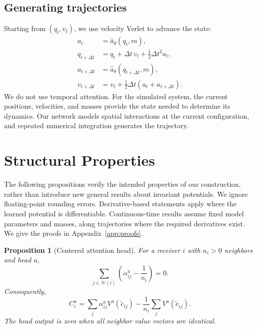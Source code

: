 \documentclass[10pt,letterpaper,twocolumn]{article}
\newtheorem{proposition}{Proposition}[section]
\newcommand{\cN}{\mathcal N}
\newcommand{\ahat}{\widehat a}
\numberwithin{equation}{section}
\begin{document}
\subsection{Generating trajectories}

Starting from $(q_t,v_t)$, we use velocity Verlet to advance the state:
\begin{equation}
\begin{aligned}
a_t&=\ahat_\theta(q_t,m),\\
q_{t+\Delta t}&=q_t+\Delta t\,v_t+\tfrac12\Delta t^2a_t,\\
a_{t+\Delta t}&=\ahat_\theta(q_{t+\Delta t},m),\\
v_{t+\Delta t}&=v_t+\tfrac12\Delta t(a_t+a_{t+\Delta t}).
\end{aligned}
\label{eq:verlet}
\end{equation}
We do not use temporal attention. For the simulated system, the current positions, velocities, and
masses provide the state needed to determine its dynamics. Our network models spatial interactions
at the current configuration, and repeated numerical integration generates the trajectory.

\section{Structural Properties}
\label{sec:properties}

The following propositions verify the intended properties of our construction, rather than
introduce new general results about invariant potentials. We ignore floating-point rounding
errors. Derivative-based statements apply where the learned potential is differentiable.
Continuous-time results assume fixed model parameters and masses, along trajectories where the
required derivatives exist. We give the proofs in Appendix~\ref{app:proofs}.

\begin{samepage}
\begin{proposition}[Centered attention head]
\label{prop:centered}
For a receiver $i$ with $n_i>0$ neighbors and head $a$,
\begin{equation}
\sum_{j\in\cN(i)}\left(\alpha_{ij}^a-\frac{1}{n_i}\right)=0.
\label{eq:zerosum}
\end{equation}
Consequently,
\begin{equation}
C_i^a=\sum_j\alpha_{ij}^aV^a(\widetilde e_{ij})
-\frac{1}{n_i}\sum_jV^a(\widetilde e_{ij}).
\label{eq:diffaverages}
\end{equation}
The head output is zero when all neighbor value vectors are identical.
\end{proposition}
\end{samepage}
\end{document}
